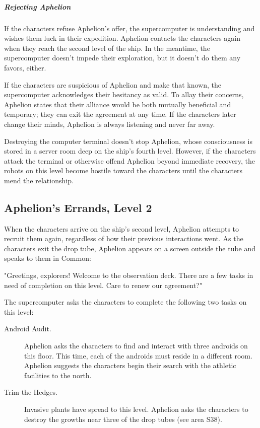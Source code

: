 \documentclass[10pt,a4paper,twoside,bg=print,twocolumn,openany,nodeprecatedcode]{dndbook}
\begin{document}
\subparagraph{Rejecting Aphelion}
If the characters refuse Aphelion's offer, the supercomputer is understanding and wishes them luck in their expedition. Aphelion contacts the characters again when they reach the second level of the ship. In the meantime, the supercomputer doesn't impede their exploration, but it doesn't do them any favors, either.

If the characters are suspicious of Aphelion and make that known, the supercomputer acknowledges their hesitancy as valid. To allay their concerns, Aphelion states that their alliance would be both mutually beneficial and temporary; they can exit the agreement at any time. If the characters later change their minds, Aphelion is always listening and never far away.

Destroying the computer terminal doesn't stop Aphelion, whose consciousness is stored in a server room deep on the ship's fourth level. However, if the characters attack the terminal or otherwise offend Aphelion beyond immediate recovery, the robots on this level become hostile toward the characters until the characters mend the relationship.

\subsection{Aphelion's Errands, Level 2}
When the characters arrive on the ship's second level, Aphelion attempts to recruit them again, regardless of how their previous interactions went. As the characters exit the drop tube, Aphelion appears on a screen outside the tube and speaks to them in Common:

\begin{DndReadAloud}{}
"Greetings, explorers! Welcome to the observation deck. There are a few tasks in need of completion on this level. Care to renew our agreement?"

\end{DndReadAloud}

The supercomputer asks the characters to complete the following two tasks on this level:


\begin{description}
\item[Android Audit.]
Aphelion asks the characters to find and interact with three androids on this floor. This time, each of the androids must reside in a different room. Aphelion suggests the characters begin their search with the athletic facilities to the north.
\item[Trim the Hedges.]
Invasive plants have spread to this level. Aphelion asks the characters to destroy the growths near three of the drop tubes (see area S38).
\end{description}
\end{document}

